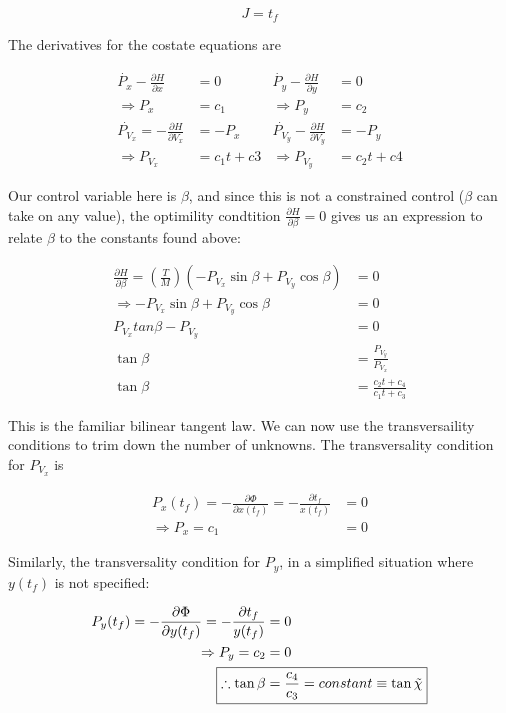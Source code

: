 \documentclass{article}
\begin{document}
\begin{equation*}
J = t_f
\end{equation*}

The derivatives for the costate equations are 

\begin{align*}
\dot{P_x}-\frac{\partial H}{\partial x} &= 0 & \dot{P_y}-\frac{\partial H}{\partial y} &= 0 \\
\Rightarrow P_x &= c_1 & \Rightarrow P_y &= c_2\\
\dot{P_{V_{x}}} = -\frac{\partial H}{\partial V_{x}} &= -P_{x}  & \dot{P_{V_{y}}}-\frac{\partial H}{\partial V_{y}} &= -P_{y} \\
\Rightarrow P_{V_{x}} &= c_1t +c3 & \Rightarrow P_{V_{y}} &= c_2t +c4
\end{align*}

Our control variable here is $\beta$, and since this is not a constrained control ($\beta$ can take on any value), the optimility condtition 
$\frac{\partial H}{\partial \beta} = 0$ gives us an expression to relate $\beta$ to the constants found above: 

\begin{align*}
\frac{\partial H}{\partial \beta} =  (\frac{T}{M}) (-P_{V_{x}} \sin\beta + P_{V_{y}}\cos\beta) &= 0 \\
\Rightarrow -P_{V_{x}} \sin\beta + P_{V_{y}}\cos\beta &= 0 \\
P_{V_{x}} tan\beta - P_{V_{y}} &= 0 \\
\tan\beta &= \frac{P_{V_{y}}}{P_{V_{x}}} \\ 
\tan\beta &= \frac{c_2 t + c_4}{c_1 t + c_3}																
\end{align*}

This is the familiar bilinear tangent law. We can now use the transversaility conditions to trim down the number of unknowns. The transversality
condition for $P_{V_{x}}$ is	

\begin{align*}
P_x (t_f) = -\frac{\partial \Phi }{\partial x(t_f)} = -\frac{\partial t_f }{x(t_f)} &= 0 \\
\Rightarrow P_x = c_1 &= 0 
\end{align*}

Similarly, the transversality condition for $P_y$, in a simplified situation where $y(t_f)$ is not specified:

\begin{align*}
P_y (t_f) = -\frac{\partial \Phi }{\partial y(t_f)} = -\frac{\partial t_f }{y(t_f)} &= 0 \\
\Rightarrow P_y = c_2 &= 0 \\
\Aboxed{\therefore\tan\beta &= \frac{c_4}{c_3} = constant \equiv \tan\tilde{\chi}}
\end{align*}
\end{document}
